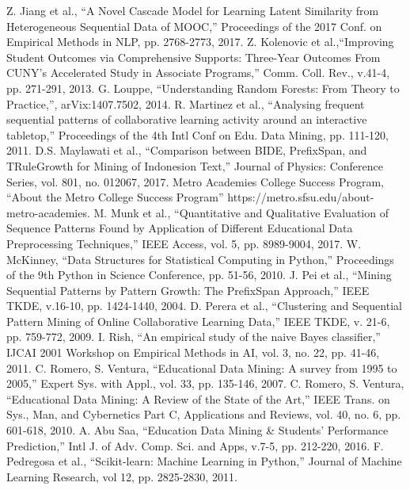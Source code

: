 \documentclass[conference]{IEEEtran}
\begin{document}
\begin{thebibliography}{00}
 Z. Jiang et al., ``A Novel Cascade Model for Learning Latent Similarity from Heterogeneous Sequential Data of MOOC,'' Proceedings of the 2017 Conf. on Empirical Methods in NLP, pp. 2768-2773, 2017.  
 Z. Kolenovic et al.,``Improving Student Outcomes via Comprehensive Supports: Three-Year Outcomes From CUNY's Accelerated Study in Associate Programs,'' Comm. Coll. Rev., v.41-4, pp. 271-291, 2013. 
 G. Louppe, ``Understanding Random Forests: From Theory to Practice,'', arVix:1407.7502, 2014. 
 R. Martinez et al., ``Analysing frequent sequential patterns of collaborative learning activity around an interactive tabletop,'' Proceedings of the 4th Intl Conf on Edu. Data Mining, pp. 111-120, 2011. 
 D.S. Maylawati et al., ``Comparison between BIDE, PrefixSpan, and TRuleGrowth for Mining of Indonesion Text,'' Journal of Physics: Conference Series, vol. 801, no. 012067, 2017.  
 Metro Academies College Success Program, ``About the Metro College Success Program'' https://metro.sfsu.edu/about-metro-academies.
 M. Munk et al., ``Quantitative and Qualitative Evaluation of Sequence Patterns Found by Application of Different Educational Data Preprocessing Techniques,'' IEEE Access, vol. 5, pp. 8989-9004, 2017.
 W. McKinney, ``Data Structures for Statistical Computing in Python,'' Proceedings of the 9th Python in Science Conference, pp. 51-56, 2010.
 J. Pei et al., ``Mining Sequential Patterns by Pattern Growth: The PrefixSpan Approach,'' IEEE TKDE, v.16-10, pp. 1424-1440, 2004. 
 D. Perera et al., ``Clustering and Sequential Pattern Mining of Online Collaborative Learning Data,'' IEEE TKDE, v. 21-6, pp. 759-772, 2009.
 I. Rish,  ``An empirical study of the naive Bayes classifier,'' IJCAI 2001 Workshop on Empirical Methods in AI, vol. 3, no. 22, pp. 41-46, 2011.
 C. Romero, S. Ventura, ``Educational Data Mining: A survey from 1995 to 2005,'' Expert Sys. with Appl., vol. 33, pp. 135-146, 2007.
 C. Romero, S. Ventura, ``Educational Data Mining: A Review of the State of the Art,'' IEEE Trans. on Sys., Man, and Cybernetics Part C, Applications and Reviews, vol. 40, no. 6, pp. 601-618, 2010.
 A. Abu Saa, ``Education Data Mining \& Students' Performance Prediction,'' Intl J. of Adv. Comp. Sci. and Apps, v.7-5, pp. 212-220, 2016.
 F. Pedregosa et al., ``Scikit-learn: Machine Learning in Python,'' Journal of Machine Learning Research, vol 12, pp. 2825-2830, 2011.

\end{thebibliography}
\end{document}
